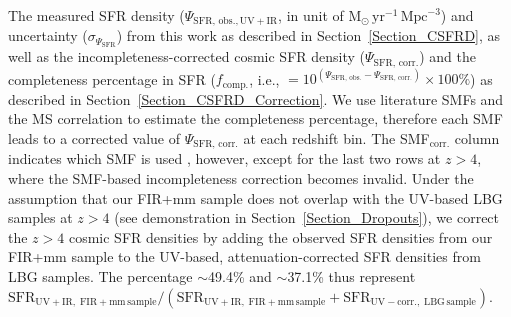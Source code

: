 \begin{table}
\begin{center}
\begin{minipage}{0.42\textwidth}
    The measured SFR density ($\Psi_{\mathrm{SFR,\,obs.,UV+IR}}$, 
    in unit of $\mathrm{M}_{\odot}\,\mathrm{yr}^{-1}\,\mathrm{Mpc}^{-3}$) 
    and uncertainty (${\sigma}_{\Psi_{\mathrm{SFR}}}$) from this work 
    as described in Section~\ref{Section_CSFRD}, 
    as well as the incompleteness-corrected cosmic SFR density 
    ($\Psi_{\mathrm{SFR,\,corr.}}$) and the completeness percentage 
    in SFR ($f_{\mathrm{comp.}}$, i.e., 
    $=10^{(\Psi_{\mathrm{SFR,\,obs.}}-\Psi_{\mathrm{SFR,\,corr.}})} \times 100\%$) 
    as described in Section~\ref{Section_CSFRD_Correction}. 
    We use literature SMFs and the \citet{Sargent2014} MS correlation to 
    estimate the completeness percentage, therefore each SMF leads to a 
    corrected value of $\Psi_{\mathrm{SFR,\,corr.}}$ at each redshift bin. 
    The SMF$_{\mathrm{corr.}}$ column indicates which SMF is used 
    \citep{Muzzin2013,Ilbert2013,Davidzon2017,Grazian2015,Song2016}, 
    however, except for the last two rows at $z>4$, 
    where the SMF-based incompleteness correction becomes invalid. 
    Under the assumption that our FIR+mm sample does not overlap with 
    the UV-based LBG samples at $z>4$ (see demonstration in Section~\ref{Section_Dropouts}), 
    we correct the $z>4$ cosmic SFR densities by adding the observed SFR densities from our FIR+mm sample 
    to the \cite[][MD14]{Madau2014a} UV-based, attenuation-corrected SFR densities from LBG samples. 
    The percentage $\sim$49.4\% and $\sim$37.1\% thus represent 
    $\mathrm{SFR}_{\mathrm{UV+IR,\;FIR+mm\,sample}}/(\mathrm{SFR}_{\mathrm{UV+IR,\;FIR+mm\,sample}} + \mathrm{SFR}_{\mathrm{UV-corr.,\;LBG\,sample}})$. 

\end{minipage}

\end{center}

\end{table}


